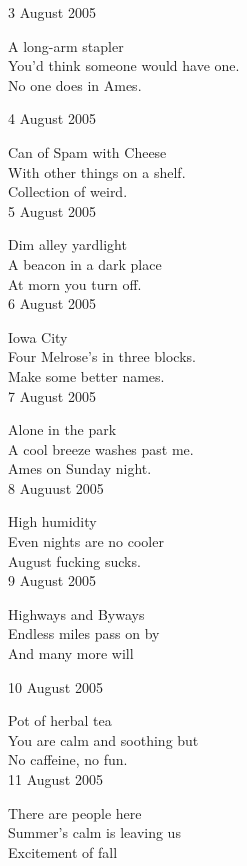 \documentclass[12pt]{article}
\begin{document}
3 August 2005

A long-arm stapler \\
You'd think someone would have one. \\
No one does in Ames. \\

\newpage
\setlength{\parskip}{1mm}

4 August 2005 

Can of Spam with Cheese \\
With other things on a shelf. \\
Collection of weird. \\

5 August 2005

Dim alley yardlight \\
A beacon in a dark place \\
At morn you turn off. \\

6 August 2005

Iowa City \\
Four Melrose's in three blocks. \\
Make some better names. \\

7 August 2005

Alone in the park \\
A cool breeze washes past me. \\
Ames on Sunday night. \\

8 Auguust 2005

High humidity \\
Even nights are no cooler \\
August fucking sucks. \\

9 August 2005

Highways and Byways \\
Endless miles pass on by \\
And many more will \\


 
\newpage

10 August 2005

Pot of herbal tea \\
You are calm and soothing but \\
No caffeine, no fun. \\

11 August 2005

There are people here \\
Summer's calm is leaving us \\
Excitement of fall \\
\end{document}
